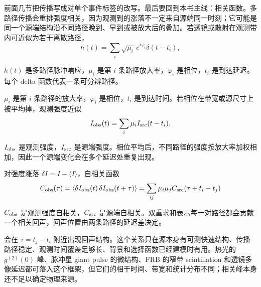 前面几节把传播写成对单个事件标签的改写。最后要回到本书主线：相关函数。多路径传播会重排强度相关，因为观测到的涨落不一定来自源端同一时刻；它可能是同一个源端结构沿不同路径晚到、早到或被放大后的叠加。若透镜或散射在观测带内可近似为若干离散路径，
\begin{equation}
  h(t)=\sum_i \sqrt{\mu_i}\,e^{i\varphi_i}\delta(t-t_i),
  \label{eq:ch14-multipath-impulse}
\end{equation}
\begin{formulaexplain}[公式 (14.28) 解读]
\(h(t)\) 是多路径脉冲响应，\(\mu_i\) 是第 \(i\) 条路径放大率，\(\varphi_i\) 是相位，\(t_i\) 是到达延迟。每个 delta 函数代表一条可分辨路径。
\end{formulaexplain}
\(\mu_i\) 是第 \(i\) 条路径的放大率，\(\varphi_i\) 是相位，\(t_i\) 是到达时间。若相位在带宽或源尺寸上被平均掉，观测强度近似
\begin{equation}
  I_{\rm obs}(t)
  =
  \sum_i \mu_i I_{\rm src}(t-t_i).
  \label{eq:ch14-multipath-intensity}
\end{equation}
\begin{formulaexplain}[公式 (14.29) 解读]
\(I_{\rm obs}\) 是观测强度，\(I_{\rm src}\) 是源端强度。相位平均后，不同路径的强度按放大率加权相加，因此一个源端变化会在多个延迟处重复出现。
\end{formulaexplain}
对强度涨落 \(\delta I=I-\langle I\rangle\)，自相关函数
\begin{equation}
  C_{\rm obs}(\tau)
  =
  \left\langle
  \delta I_{\rm obs}(t)\,
  \delta I_{\rm obs}(t+\tau)
  \right\rangle
  =
  \sum_{ij}\mu_i\mu_j
  C_{\rm src}\!\left(\tau+t_i-t_j\right)
  \label{eq:ch14-correlation-echo}
\end{equation}
\begin{formulaexplain}[公式 (14.30) 解读]
\(C_{\rm obs}\) 是观测强度自相关，\(C_{\rm src}\) 是源端自相关。双重求和表示每一对路径都会贡献一个相关回声，回声位置由两条路径的延迟差决定。
\end{formulaexplain}
会在 \(\tau=t_j-t_i\) 附近出现回声结构。这个关系只在源本身有可测快速结构、传播路径稳定、观测时间覆盖足够长、背景和选择函数已经建模时有用。热光的 \(g^{(2)}(0)\) 峰、脉冲星 giant pulse 的微结构、FRB 的窄带 scintillation 和透镜多像延迟都可落入这个框架，但它们的相干时间、带宽和统计分布不同；相关峰本身还不足以确定物理来源。

